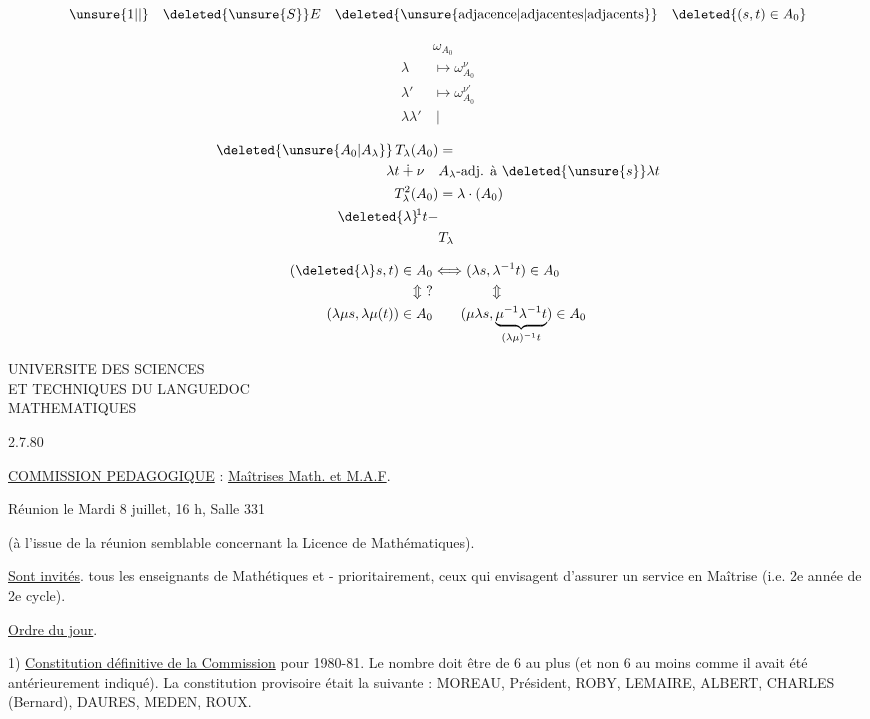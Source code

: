 \[
\unsure{1|\vert}\quad \deleted{\unsure{S}}E\quad\deleted{\text{\unsure{adjacence|adjacentes|adjacents}}}\quad\deleted{(s,t)\in A_0}
\]

\[
\begin{aligned}
&\omega_{A_0}\\
\lambda&\longmapsto\omega_{A_0}^\nu\\
\lambda'&\longmapsto\omega_{A_0}^{\nu'}\\
\lambda\lambda'&\ \vert
\end{aligned}
\]

\[
\begin{aligned}
\deleted{\unsure{A_0|A_\lambda}}\,T_\lambda(A_0)&=\\
\lambda t\dotplus\nu\quad&A_\lambda\text{-adj. à }\deleted{\unsure{s}}\lambda t\\
T_\lambda^2(A_0)&=\lambda\cdot(A_0)\\
\deleted{\lambda}\!{}^{1}t-&\\
&T_\lambda
\end{aligned}
\]

\[
\begin{aligned}
(\deleted{\lambda}s,t)\in A_0&\Longleftrightarrow(\lambda s,\lambda^{-1}t)\in A_0\\
\Updownarrow\ ?&\qquad\qquad\Updownarrow\\
(\lambda\mu s,\lambda\mu(t))\in A_0&\qquad(\mu\lambda s,\underset{(\lambda\mu)^{-1}t}{\underbrace{\mu^{-1}\lambda^{-1}t}})\in A_0
\end{aligned}
\]


UNIVERSITE DES SCIENCES\\
ET TECHNIQUES DU LANGUEDOC\\
MATHEMATIQUES

2.7.80

\uline{COMMISSION PEDAGOGIQUE} : \uline{Maîtrises Math. et M.A.F}.

Réunion le Mardi 8 juillet, 16 h, Salle 331

(à l'issue de la réunion semblable concernant la Licence de Mathématiques).

\uline{Sont invités}. tous les enseignants de Mathétiques et - prioritairement, ceux qui envisagent d'assurer un service en Maîtrise (i.e. 2e année de 2e cycle).

\uline{Ordre du jour}.

1) \uline{Constitution définitive de la Commission} pour 1980-81. Le nombre doit être de 6 au plus (et non 6 au moins comme il avait été antérieurement indiqué). La constitution provisoire était la suivante : MOREAU, Président, ROBY, LEMAIRE, ALBERT, CHARLES (Bernard), DAURES, MEDEN, ROUX.


